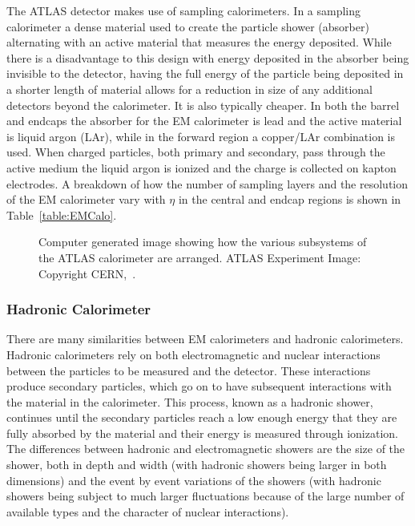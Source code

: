 
The ATLAS detector makes use of sampling calorimeters.  
In a sampling calorimeter a dense material used to create the particle shower (absorber) alternating with an active material that measures the energy deposited.  
While there is a disadvantage to this design with energy deposited in the absorber being invisible to the detector, having the full energy of the particle being deposited in a shorter length of material allows for a reduction in size of any additional detectors beyond the calorimeter.  
It is also typically cheaper.  
In both the barrel and endcaps the absorber for the EM calorimeter is lead and the active material is liquid argon (LAr), while in the forward region a copper/LAr combination is used.  
When charged particles, both primary and secondary, pass through the active medium the liquid argon is ionized and the charge is collected on kapton electrodes.  
A breakdown of how the number of sampling layers and the resolution of the EM calorimeter vary with $\eta$ in the central and endcap regions is shown in Table~\ref{table:EMCalo}.  

\begin{figure}[!ht]
  \begin{center}
  \end{center}
  \caption[Layout of the ATLAS Calorimeters]
  {\small Computer generated image showing how the various subsystems of the ATLAS calorimeter are arranged.  ATLAS Experiment Image: Copyright CERN,~\cite{Pequenao:1095927}.}
\end{figure}


\subsubsection{Hadronic Calorimeter}
\label{Had}
There are many similarities between EM calorimeters and hadronic calorimeters.  
Hadronic calorimeters rely on both electromagnetic and nuclear interactions between the particles to be measured and the detector.  
These interactions produce secondary particles, which go on to have subsequent interactions with the material in the calorimeter.  
This process, known as a hadronic shower, continues until the secondary particles reach a low enough energy that they are fully absorbed by the material and their energy is measured through ionization.  
The differences between hadronic and electromagnetic showers are the size of the shower, both in depth and width (with hadronic showers being larger in both dimensions) and the event by event variations of the showers (with hadronic showers being subject to much larger fluctuations because of the large number of available types and the character of nuclear interactions).  

